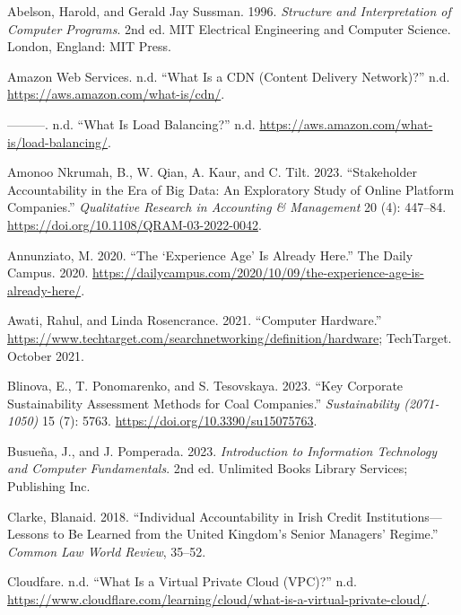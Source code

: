 \documentclass[
  letterpaper,
  DIV=11,
  numbers=noendperiod]{scrreprt}
\newlength{\cslhangindent}
\newenvironment{CSLReferences}[2] %
 {\begin{list}{}{%
  \setlength{\itemindent}{0pt}
  \setlength{\leftmargin}{0pt}
  \setlength{\parsep}{0pt}
  \ifodd #1
   \setlength{\leftmargin}{\cslhangindent}
   \setlength{\itemindent}{-1\cslhangindent}
  \fi
  \setlength{\itemsep}{#2\baselineskip}}}
 {\end{list}}
\begin{document}
\label{refs}
\begin{CSLReferences}{1}{0}
Abelson, Harold, and Gerald Jay Sussman. 1996. \emph{Structure and
Interpretation of Computer Programs}. 2nd ed. MIT Electrical Engineering
and Computer Science. London, England: MIT Press.

Amazon Web Services. n.d. {``What Is a CDN (Content Delivery
Network)?''} n.d. \url{https://aws.amazon.com/what-is/cdn/}.

---------. n.d. {``What Is Load Balancing?''} n.d.
\url{https://aws.amazon.com/what-is/load-balancing/}.

Amonoo Nkrumah, B., W. Qian, A. Kaur, and C. Tilt. 2023. {``Stakeholder
Accountability in the Era of Big Data: An Exploratory Study of Online
Platform Companies.''} \emph{Qualitative Research in Accounting \&
Management} 20 (4): 447--84.
\url{https://doi.org/10.1108/QRAM-03-2022-0042}.

Annunziato, M. 2020. {``The {`Experience Age'} Is Already Here.''} The
Daily Campus. 2020.
\url{https://dailycampus.com/2020/10/09/the-experience-age-is-already-here/}.

Awati, Rahul, and Linda Rosencrance. 2021. {``Computer Hardware.''}
\url{https://www.techtarget.com/searchnetworking/definition/hardware};
TechTarget. October 2021.

Blinova, E., T. Ponomarenko, and S. Tesovskaya. 2023. {``Key Corporate
Sustainability Assessment Methods for Coal Companies.''}
\emph{Sustainability (2071-1050)} 15 (7): 5763.
\url{https://doi.org/10.3390/su15075763}.

Busueña, J., and J. Pomperada. 2023. \emph{Introduction to Information
Technology and Computer Fundamentals}. 2nd ed. Unlimited Books Library
Services; Publishing Inc.

Clarke, Blanaid. 2018. {``Individual Accountability in Irish Credit
Institutions---Lessons to Be Learned from the United Kingdom's Senior
Managers' Regime.''} \emph{Common Law World Review}, 35--52.

Cloudfare. n.d. {``What Is a Virtual Private Cloud (VPC)?''} n.d.
\url{https://www.cloudflare.com/learning/cloud/what-is-a-virtual-private-cloud/}.


\end{CSLReferences}
\end{document}
